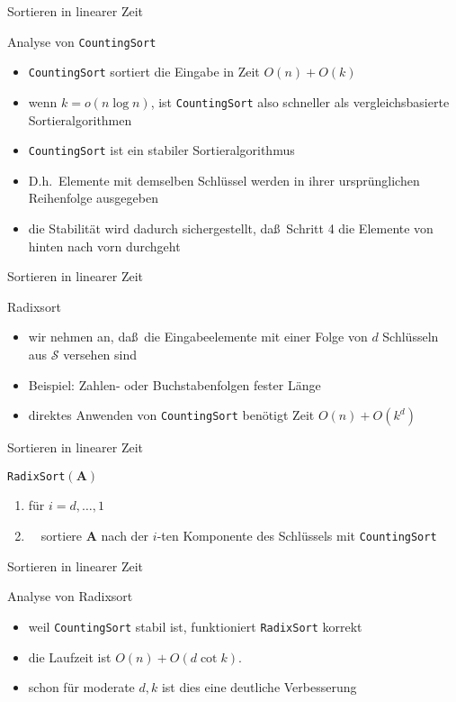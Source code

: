 \documentclass[aspectratio=1610, 11pt]{beamer}
\renewcommand{\vec}[1]{\boldsymbol{#1}}
\newcommand\cS{\mathcal S}
\newcommand\vA{\vec A}
\begin{document}
\begin{frame}{Sortieren in linearer Zeit}
	\begin{exampleblock}{Analyse von {\tt CountingSort}}
		\begin{itemize}
			\item {\tt CountingSort} sortiert die Eingabe in Zeit $O(n)+O(k)$
			\item wenn $k=o(n\log n)$, ist {\tt CountingSort} also schneller als vergleichsbasierte Sortieralgorithmen
			\item {\tt CountingSort} ist ein \alert{stabiler} Sortieralgorithmus
			\item D.h.\ Elemente mit demselben Schl\"ussel werden in ihrer urspr\"unglichen Reihenfolge ausgegeben
			\item die Stabilit\"at wird dadurch sichergestellt, da\ss\ Schritt 4 die Elemente von hinten nach vorn durchgeht
		\end{itemize}
	\end{exampleblock}
\end{frame}

\begin{frame}{Sortieren in linearer Zeit}
	\begin{exampleblock}{Radixsort}
		\begin{itemize}
			\item wir nehmen an, da\ss\ die Eingabeelemente mit einer Folge von $d$ Schl\"usseln aus $\cS$ versehen sind
			\item \alert{Beispiel:} Zahlen- oder Buchstabenfolgen fester L\"ange
			\item direktes Anwenden von {\tt CountingSort} ben\"otigt Zeit $O(n)+O(k^d)$
		\end{itemize}
	\end{exampleblock}
\end{frame}

\begin{frame}{Sortieren in linearer Zeit}
	\begin{exampleblock}{\tt RadixSort$(\vA)$}
		\begin{enumerate}
		\item f\"ur $i=d,\ldots,1$
		\item $\quad$sortiere $\vA$ nach der $i$-ten Komponente des Schl\"ussels mit {\tt CountingSort}
		\end{enumerate}
	\end{exampleblock}
\end{frame}

\begin{frame}{Sortieren in linearer Zeit}
	\begin{exampleblock}{Analyse von Radixsort}
		\begin{itemize}
			\item weil {\tt CountingSort} stabil ist, funktioniert {\tt RadixSort} korrekt
			\item die Laufzeit ist $O(n)+O(d\cot k)$.
			\item schon f\"ur moderate $d,k$ ist dies eine deutliche Verbesserung
		\end{itemize}
	\end{exampleblock}
\end{frame}
\end{document}

